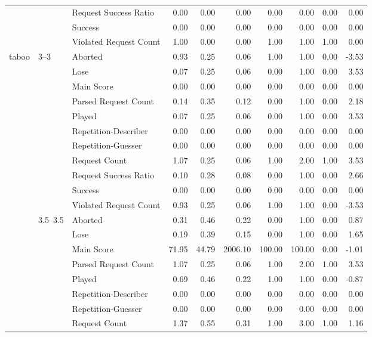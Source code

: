 \begin{tabular}{lllrrrrrrr}
 &  & Request Success Ratio & 0.00 & 0.00 & 0.00 & 0.00 & 0.00 & 0.00 & 0.00 \\
 &  & Success & 0.00 & 0.00 & 0.00 & 0.00 & 0.00 & 0.00 & 0.00 \\
 &  & Violated Request Count & 1.00 & 0.00 & 0.00 & 1.00 & 1.00 & 1.00 & 0.00 \\
\cline{1-10} \cline{2-10}
\multirow[t]{121}{*}{taboo} & \multirow[t]{11}{*}{3--3} & Aborted & 0.93 & 0.25 & 0.06 & 1.00 & 1.00 & 0.00 & -3.53 \\
 &  & Lose & 0.07 & 0.25 & 0.06 & 0.00 & 1.00 & 0.00 & 3.53 \\
 &  & Main Score & 0.00 & 0.00 & 0.00 & 0.00 & 0.00 & 0.00 & 0.00 \\
 &  & Parsed Request Count & 0.14 & 0.35 & 0.12 & 0.00 & 1.00 & 0.00 & 2.18 \\
 &  & Played & 0.07 & 0.25 & 0.06 & 0.00 & 1.00 & 0.00 & 3.53 \\
 &  & Repetition-Describer & 0.00 & 0.00 & 0.00 & 0.00 & 0.00 & 0.00 & 0.00 \\
 &  & Repetition-Guesser & 0.00 & 0.00 & 0.00 & 0.00 & 0.00 & 0.00 & 0.00 \\
 &  & Request Count & 1.07 & 0.25 & 0.06 & 1.00 & 2.00 & 1.00 & 3.53 \\
 &  & Request Success Ratio & 0.10 & 0.28 & 0.08 & 0.00 & 1.00 & 0.00 & 2.66 \\
 &  & Success & 0.00 & 0.00 & 0.00 & 0.00 & 0.00 & 0.00 & 0.00 \\
 &  & Violated Request Count & 0.93 & 0.25 & 0.06 & 1.00 & 1.00 & 0.00 & -3.53 \\
\cline{2-10}
 & \multirow[t]{11}{*}{3.5--3.5} & Aborted & 0.31 & 0.46 & 0.22 & 0.00 & 1.00 & 0.00 & 0.87 \\
 &  & Lose & 0.19 & 0.39 & 0.15 & 0.00 & 1.00 & 0.00 & 1.65 \\
 &  & Main Score & 71.95 & 44.79 & 2006.10 & 100.00 & 100.00 & 0.00 & -1.01 \\
 &  & Parsed Request Count & 1.07 & 0.25 & 0.06 & 1.00 & 2.00 & 1.00 & 3.53 \\
 &  & Played & 0.69 & 0.46 & 0.22 & 1.00 & 1.00 & 0.00 & -0.87 \\
 &  & Repetition-Describer & 0.00 & 0.00 & 0.00 & 0.00 & 0.00 & 0.00 & 0.00 \\
 &  & Repetition-Guesser & 0.00 & 0.00 & 0.00 & 0.00 & 0.00 & 0.00 & 0.00 \\
 &  & Request Count & 1.37 & 0.55 & 0.31 & 1.00 & 3.00 & 1.00 & 1.16 \\

\end{tabular}
